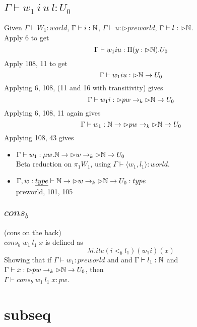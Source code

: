 \message{ !name(paper.tex)}\documentclass{article}
\begin{document}
\subsection{$\Gamma \vdash w_1 \: i \: u \: l : U_0$}
Given $\Gamma \vdash W_1 : world$, $\Gamma \vdash i : \mathbb{N}$, $\Gamma \vdash u : \rhd preworld$, $\Gamma \vdash l : \rhd \mathbb{N}$.\\
 Apply 6 to get
   \[\Gamma \vdash w_1 i u: \Pi(y: \rhd \mathbb{N}). U_0 \]
Apply 108, 11 to get
\[\Gamma \vdash w_1 i u:  \rhd \mathbb{N} \rightarrow U_0 \]
Applying 6, 108, (11 and 16 with transitivity) gives
\[\Gamma \vdash w_1 i: \rhd pw \rightarrow_k \rhd \mathbb{N} \rightarrow U_0 \]
Applying 6, 108, 11 again gives 
\[\Gamma \vdash w_1: \mathbb{N} \rightarrow \rhd pw \rightarrow_k \rhd \mathbb{N} \rightarrow U_0 \]
      Applying 108, 43 gives
\begin{itemize}
       \item $\Gamma \vdash w_1: \mu w. \mathbb{N} \rightarrow \rhd w \rightarrow_k \rhd \mathbb{N} \rightarrow U_0 $\\
         Beta reduction on $\pi_1 W_1$, using $\Gamma \vdash \langle w_1, l_1 \rangle : world$.
      \item $\Gamma, w: \underline{type} \vdash \mathbb{N} \rightarrow \rhd w \rightarrow_k \rhd \mathbb{N} \rightarrow U_0 : type $\\
            preworld, 101, 105
                  \end{itemize}
                  
\subsection{$cons_b$}
(cons on the back)\\
$cons_b \; w_1 \: l_1 \; x$ is defined as
\[ \lambda i. ite (i <_b l_1) (w_1 i) (x)\]
Showing that if $\Gamma \vdash w_1 : preworld$ and
and $\Gamma \vdash l_1 : \mathbb{N}$ and
$\Gamma \vdash x: \rhd pw \rightarrow_k \rhd \mathbb{N} \rightarrow U_0$, then \\$\Gamma \vdash cons_b \; w_1 \: l_1 \; x : pw$.



\section*{subseq}
\end{document}
